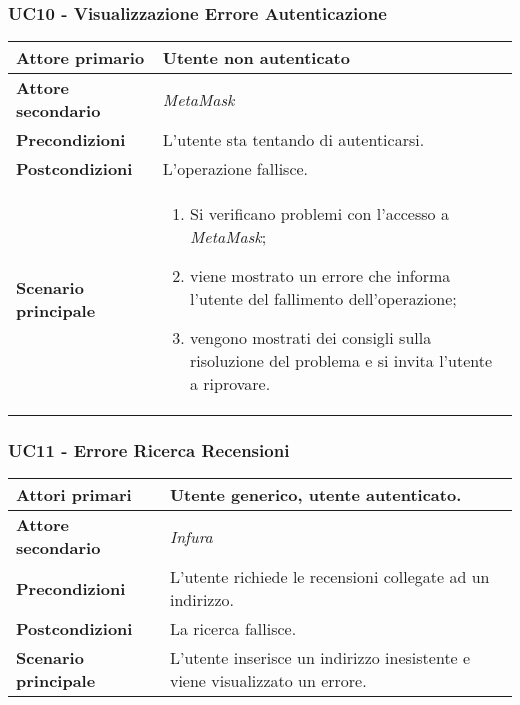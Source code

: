 \subsubsection{UC10 - Visualizzazione Errore Autenticazione}
\label{UC10}
\begin{center}
\renewcommand{\arraystretch}{1.5}
\begin{tabular}{ | m{10em} | m{20em} | }
    \hline
    \textbf{Attore primario} & Utente non autenticato \\
    \hline
    \textbf{Attore secondario} & \textit{MetaMask} \\
    \hline
    \textbf{Precondizioni} & L'utente sta tentando di autenticarsi. \\
    \hline
    \textbf{Postcondizioni} & L'operazione fallisce. \\
    \hline
    \textbf{Scenario principale} & \begin{enumerate}
        \item Si verificano problemi con l'accesso a \textit{MetaMask};
        \item viene mostrato un errore che informa l'utente del fallimento dell'operazione;
        \item vengono mostrati dei consigli sulla risoluzione del problema e si invita
              l'utente a riprovare.
    \end{enumerate} \\
    \hline
   \end{tabular}
\end{center}

\subsubsection{UC11 - Errore Ricerca Recensioni}
\label{UC11}
\begin{center}
\renewcommand{\arraystretch}{1.5}
\begin{tabular}{ | m{10em} | m{20em} | }
    \hline
    \textbf{Attori primari} & Utente generico, utente autenticato. \\
    \hline
    \textbf{Attore secondario} & \textit{Infura} \\
    \hline
    \textbf{Precondizioni} & L'utente richiede le recensioni collegate ad un indirizzo. \\
    \hline
    \textbf{Postcondizioni} & La ricerca fallisce. \\
    \hline
    \textbf{Scenario principale} & L'utente inserisce un indirizzo inesistente e viene visualizzato un errore. \\
    \hline
   \end{tabular}
\end{center}

